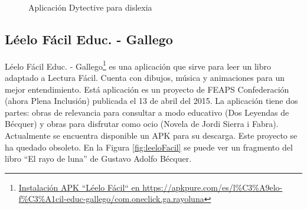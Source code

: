 \begin{figure}[h]
	\centering

	\caption{Aplicación Dytective para dislexia}
	\label{fig:dytective}
\end{figure}

\subsection{Léelo Fácil Educ. - Gallego }
Léelo Fácil Educ. - Gallego\footnote{\href{https://apkpure.com/es/l\%C3\%A9elo-f\%C3\%A1cil-educ-gallego/com.oneclick.ga.rayoluna}{Instalación APK ``Léelo Fácil`` en https://apkpure.com/es/l\%C3\%A9elo-f\%C3\%A1cil-educ-gallego/com.oneclick.ga.rayoluna}} es una aplicación que sirve para leer un libro adaptado a Lectura Fácil. Cuenta con dibujos, música y animaciones para un mejor entendimiento. Está aplicación es un proyecto de FEAPS Confederación (ahora Plena Inclusión) publicada el 13 de abril del 2015. La aplicación tiene dos partes: obras de relevancia para consultar a modo educativo (Dos Leyendas de Bécquer) y obras para disfrutar como ocio (Novela de Jordi Sierra i Fabra). Actualmente se encuentra disponible un APK para su descarga. Este proyecto se ha quedado obsoleto. En la Figura \ref{fig:leeloFacil} se puede ver un fragmento del libro ``El rayo de luna'' de Gustavo Adolfo Bécquer.

